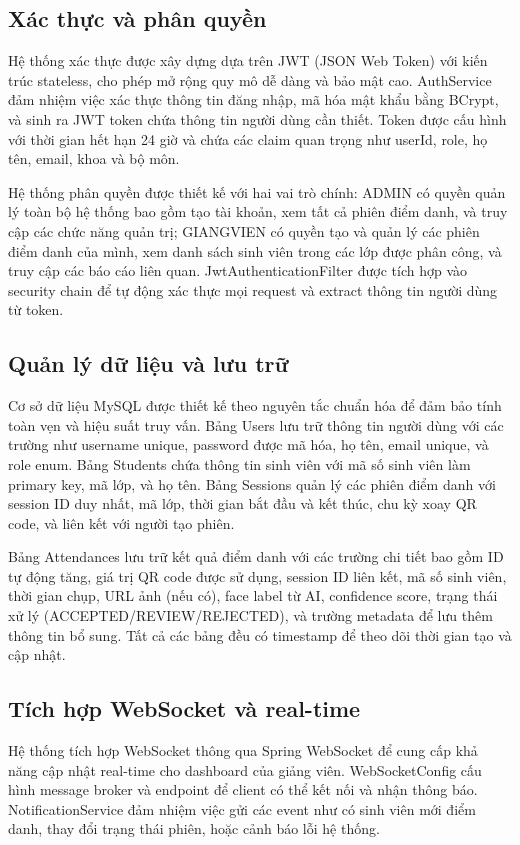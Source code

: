 \documentclass[12pt,a4paper]{report}
\begin{document}
\subsection{Xác thực và phân quyền}
Hệ thống xác thực được xây dựng dựa trên JWT (JSON Web Token) với kiến trúc stateless, cho phép mở rộng quy mô dễ dàng và bảo mật cao. AuthService đảm nhiệm việc xác thực thông tin đăng nhập, mã hóa mật khẩu bằng BCrypt, và sinh ra JWT token chứa thông tin người dùng cần thiết. Token được cấu hình với thời gian hết hạn 24 giờ và chứa các claim quan trọng như userId, role, họ tên, email, khoa và bộ môn.

Hệ thống phân quyền được thiết kế với hai vai trò chính: ADMIN có quyền quản lý toàn bộ hệ thống bao gồm tạo tài khoản, xem tất cả phiên điểm danh, và truy cập các chức năng quản trị; GIANGVIEN có quyền tạo và quản lý các phiên điểm danh của mình, xem danh sách sinh viên trong các lớp được phân công, và truy cập các báo cáo liên quan. JwtAuthenticationFilter được tích hợp vào security chain để tự động xác thực mọi request và extract thông tin người dùng từ token.

\subsection{Quản lý dữ liệu và lưu trữ}
Cơ sở dữ liệu MySQL được thiết kế theo nguyên tắc chuẩn hóa để đảm bảo tính toàn vẹn và hiệu suất truy vấn. Bảng Users lưu trữ thông tin người dùng với các trường như username unique, password được mã hóa, họ tên, email unique, và role enum. Bảng Students chứa thông tin sinh viên với mã số sinh viên làm primary key, mã lớp, và họ tên. Bảng Sessions quản lý các phiên điểm danh với session ID duy nhất, mã lớp, thời gian bắt đầu và kết thúc, chu kỳ xoay QR code, và liên kết với người tạo phiên.

Bảng Attendances lưu trữ kết quả điểm danh với các trường chi tiết bao gồm ID tự động tăng, giá trị QR code được sử dụng, session ID liên kết, mã số sinh viên, thời gian chụp, URL ảnh (nếu có), face label từ AI, confidence score, trạng thái xử lý (ACCEPTED/REVIEW/REJECTED), và trường metadata để lưu thêm thông tin bổ sung. Tất cả các bảng đều có timestamp để theo dõi thời gian tạo và cập nhật.

\subsection{Tích hợp WebSocket và real-time}
Hệ thống tích hợp WebSocket thông qua Spring WebSocket để cung cấp khả năng cập nhật real-time cho dashboard của giảng viên. WebSocketConfig cấu hình message broker và endpoint để client có thể kết nối và nhận thông báo. NotificationService đảm nhiệm việc gửi các event như có sinh viên mới điểm danh, thay đổi trạng thái phiên, hoặc cảnh báo lỗi hệ thống.
\end{document}
